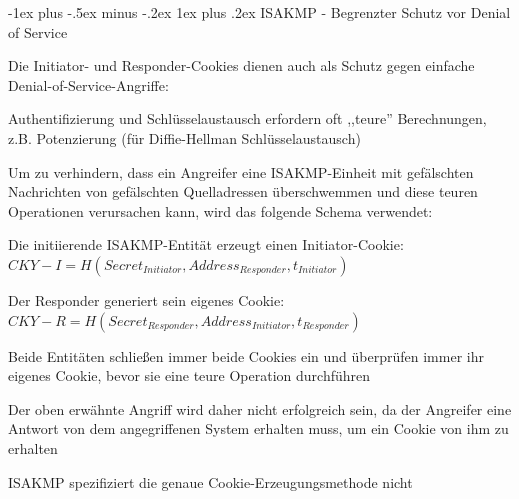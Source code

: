 \documentclass[a4paper]{article}
\makeatletter
\renewcommand{\subsubsection}{\@startsection{subsubsection}{3}{0mm}%
 {-1ex plus -.5ex minus -.2ex}%
 {1ex plus .2ex}%
 {\normalfont\small\bfseries}}
\makeatother
\begin{document}
\begin{multicols}{3}
      \subsubsection{ISAKMP - Begrenzter Schutz vor Denial of Service}
      \begin{itemize*}
            \item Die Initiator- und Responder-Cookies dienen auch als Schutz gegen einfache Denial-of-Service-Angriffe:
            \begin{itemize*}
                  \item Authentifizierung und Schlüsselaustausch erfordern oft ,,teure'' Berechnungen, z.B. Potenzierung (für Diffie-Hellman Schlüsselaustausch)
                  \item Um zu verhindern, dass ein Angreifer eine ISAKMP-Einheit mit gefälschten Nachrichten von gefälschten Quelladressen überschwemmen und diese teuren Operationen verursachen kann, wird das folgende Schema verwendet:
                  \begin{itemize*}
                        \item Die initiierende ISAKMP-Entität erzeugt einen Initiator-Cookie: $CKY-I = H(Secret_{Initiator}, Address_{Responder}, t_{Initiator})$
                        \item Der Responder generiert sein eigenes Cookie: $CKY-R = H(Secret_{Responder}, Address_{Initiator}, t_{Responder})$
                        \item Beide Entitäten schließen immer beide Cookies ein und überprüfen immer ihr eigenes Cookie, bevor sie eine teure Operation durchführen
                        \item Der oben erwähnte Angriff wird daher nicht erfolgreich sein, da der Angreifer eine Antwort von dem angegriffenen System erhalten muss, um ein Cookie von ihm zu erhalten
                  \end{itemize*}
                  \item ISAKMP spezifiziert die genaue Cookie-Erzeugungsmethode nicht
            \end{itemize*}
      \end{itemize*}


\end{multicols}
\end{document}
